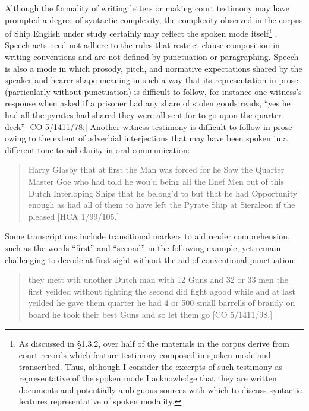   Although the formality of writing letters or making court testimony may have prompted a degree of syntactic complexity, the complexity observed in the corpus of Ship English under study certainly may reflect the spoken mode itself\footnote{As discussed in §1.3.2, over half of the materials in the corpus derive from court records which feature testimony composed in spoken mode and transcribed. Thus, although I consider the excerpts of such testimony as representative of the spoken mode I acknowledge that they are written documents and potentially ambiguous sources with which to discuss syntactic features representative of spoken modality.} . Speech acts need not adhere to the rules that restrict clause composition in writing conventions and are not defined by punctuation or paragraphing. Speech is also a mode in which prosody, pitch, and normative expectations shared by the speaker and hearer shape meaning in such a way that its representation in prose (particularly without punctuation) is difficult to follow, for instance one witness’s response when asked if a prisoner had any share of stolen goods reads, “yes he had all the pyrates had shared they were all sent for to go upon the quarter deck” [CO 5/1411/78.] Another witness testimony is difficult to follow in prose owing to the extent of adverbial interjections that may have been spoken in a different tone to aid clarity in oral communication:

\begin{quotation}
Harry Glasby that at first the Man was forced for he Saw the Quarter Master Goe who had told he wou’d being all the Enef Men out of this Dutch Interloping Ships that he belong’d to but that he had Opportunity enough as had all of them to have left the Pyrate Ship at Sieraleon if the pleased [HCA 1/99/105.]\end{quotation}

Some transcriptions include transitional markers to aid reader comprehension, such as the words “first” and “second” in the following example, yet remain challenging to decode at first sight without the aid of conventional punctuation: 

\begin{quotation}
they mett wth unother Dutch man with 12 Guns and 32 or 33 men the first yeilded without fighting the second did fight agood while and at last yeilded he gave them quarter he had 4 or 500 small barrells of brandy on board he took their best Guns and so let them go [CO 5/1411/98.]\end{quotation}

